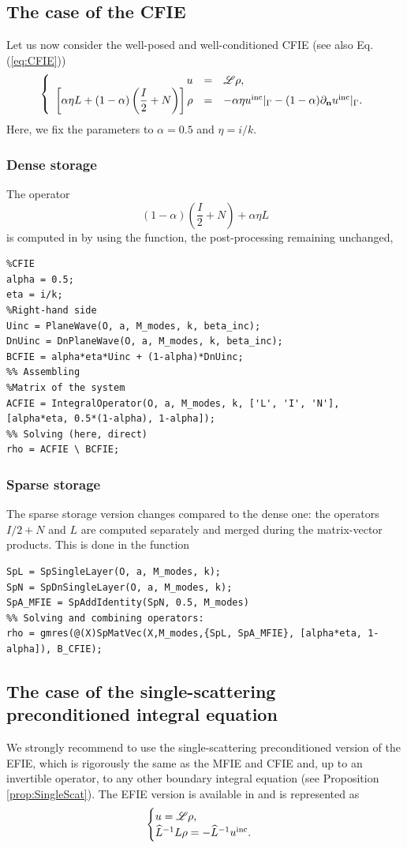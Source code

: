 \subsection{The case of the CFIE}

Let us now consider  the well-posed and well-conditioned CFIE (see also Eq. (\ref{eq:CFIE}))
$$
\left\{\begin{array}{r c l}
u &=& {\mathscr L}\rho,\\
\displaystyle \left[\alpha\eta L  + (1-\alpha)\left(\frac{I}{2}+N\right)\right]\rho &=& -\alpha\eta u^{\textrm{inc}}|_{\Gamma} - (1-\alpha) \partial_{\mathbf{n}}u^{\textrm{inc}}|_{\Gamma}.
\end{array}\right.
$$
Here, we fix the parameters  to $\alpha=0.5$ and $\eta = i/k$. 

\subsubsection{Dense storage}

The operator $$(1-\alpha)\left(\frac{I}{2}+N\right) + \alpha\eta L$$ is computed in \mudiff by
using the \IntegralOperator function,  the post-processing remaining  unchanged,
\begin{lstlisting}
%CFIE
alpha = 0.5;
eta = i/k;
%Right-hand side
Uinc = PlaneWave(O, a, M_modes, k, beta_inc);
DnUinc = DnPlaneWave(O, a, M_modes, k, beta_inc);
BCFIE = alpha*eta*Uinc + (1-alpha)*DnUinc;
%% Assembling
%Matrix of the system
ACFIE = IntegralOperator(O, a, M_modes, k, ['L', 'I', 'N'], [alpha*eta, 0.5*(1-alpha), 1-alpha]);
%% Solving (here, direct)
rho = ACFIE \ BCFIE;
\end{lstlisting}
\medskip

\subsubsection{Sparse storage}

The sparse storage version changes compared to the dense one: the operators $I/2 + N$ and $L$ are computed separately and merged during the matrix-vector products. This is done in the \SpMatVec function
\begin{lstlisting}
SpL = SpSingleLayer(O, a, M_modes, k);
SpN = SpDnSingleLayer(O, a, M_modes, k);
SpA_MFIE = SpAddIdentity(SpN, 0.5, M_modes)
%% Solving and combining operators:
rho = gmres(@(X)SpMatVec(X,M_modes,{SpL, SpA_MFIE}, [alpha*eta, 1-alpha]), B_CFIE);
\end{lstlisting}
\medskip

\subsection{The case of the single-scattering preconditioned integral equation}
\label{secEx:PrecondD}
We strongly recommend
 to use the single-scattering preconditioned version of the EFIE, which is rigorously the same as the MFIE and CFIE and, up to an invertible operator, 
 to any other boundary integral equation (see Proposition \ref{prop:SingleScat}). The EFIE version is available in \mudiff and is represented as
$$
\begin{cases}
u = {\mathscr L}\rho,\\
\widehat{L}^{-1} L \rho = -\widehat{L}^{-1}u^{\textrm{inc}}.
\end{cases}
$$

